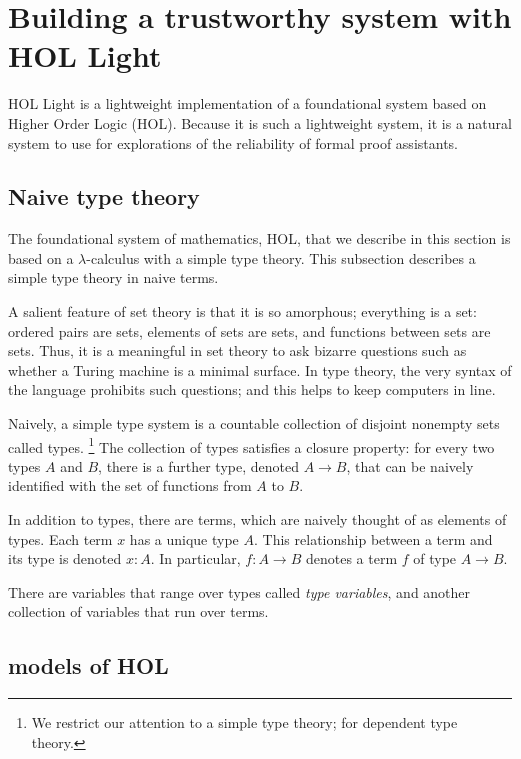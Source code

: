 \documentclass[brochure,english,12pt]{bourbaki}
\theoremstyle{plain}
\def\op#1{{\operatorname{#1}}}
\begin{document}
\section{Building a trustworthy system with HOL Light}

\def\bool{\op{bool}}
\def\Fun{\op{Fun}}

HOL Light is a lightweight implementation of a foundational system
based on Higher Order Logic (HOL).  Because it is such a lightweight system,
it is a natural system to use for explorations of the reliability of formal proof assistants.



\subsection{Naive type theory}



The foundational system of mathematics, HOL, that we describe in this section is based
on a $\lambda$-calculus with a simple type theory.  This subsection describes a simple type theory in
naive terms.  

A salient feature of set theory is that it is so amorphous; everything is a set:
ordered pairs are sets, elements of sets are sets,
and functions between sets are sets.
Thus, it is a meaningful in set theory to ask bizarre questions such as whether 
a Turing machine is a minimal surface.  In type theory,
the very syntax of the language prohibits such questions; and this helps to keep computers in line.

Naively, a simple type system is a countable collection of disjoint nonempty sets called types.
\footnote{We restrict our attention to a simple type theory; for dependent type theory.}
The collection of types satisfies a closure property: for every two types $A$ and $B$,
there  is a further type, denoted $A\to B$, that can be naively identified with the set of functions from
$A$ to $B$.  

In addition to types, there are terms, which are naively thought of as elements of types.
Each term $x$ has a unique type $A$.  This relationship between a term and its type is denoted $x:A$.
In particular, $f:A\to B$ denotes a term $f$ of type $A\to B$.

There are variables that range over types called {\it type variables}, and another
collection of variables that run over terms.


\subsection{models of HOL}
\end{document}
